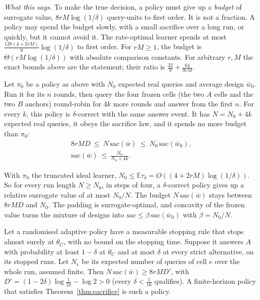 \emph{What this says.} To make the true decision, a policy must give up a \emph{budget} of
surrogate value, $8rM\log(1/\delta)$ query-units to first order. It is not a fraction. A policy
may spend the budget slowly, with a small sacrifice over a long run, or quickly, but it cannot
avoid it. The rate-optimal learner spends at most $\frac{128(4+2rM)}{9}\log(1/\delta)$ to first
order. For $rM\ge1$, the budget is $\Theta(rM\log(1/\delta))$ with absolute comparison constants.
For arbitrary $r,M$ the exact bounds above are the statement; their ratio is
$\frac{32}{9}+\frac{64}{9rM}$.

\begin{theorem}
\label{thm:dilute}
Let $\pi_{0}$ be a policy as above with $N_{0}$ expected real queries and average design
$\bar w_{0}$. Run it for its $n$ rounds, then query the four frozen cells (the two $A$ cells and the two $B$ anchors) round-robin for $4k$ more
rounds and answer from the first $n$. For every $k$, this policy is $\delta$-correct with the same
answer event. It has $N=N_{0}+4k$ expected real queries, it obeys the sacrifice law, and it spends
no more budget than $\pi_{0}$:
\begin{gather*}
8rMD\ \le\ N\,\mathrm{sac}(\bar w)\ \le\ N_{0}\,\mathrm{sac}(\bar w_{0}),\\
\mathrm{sac}(\bar w)\ \le\ \frac{N_{0}}{N_{0}+4k}.
\end{gather*}
\end{theorem}


With $\pi_{0}$ the truncated ideal learner, $N_{0}\le\mathbb{E}\tau_{\delta}
=O((4+2rM)\log(1/\delta))$. So for every run length $N\ge N_{0}$, in steps of four, a
$\delta$-correct policy gives up a relative surrogate value of at most $N_{0}/N$. The budget
$N\,\mathrm{sac}(\bar w)$ stays between $8rMD$ and $N_{0}$. The padding is surrogate-optimal, and
concavity of the frozen value turns the mixture of designs into
$\mathrm{sac}\le\beta\,\mathrm{sac}(\bar w_{0})$ with $\beta=N_{0}/N$.

\begin{theorem}
\label{thm:sacstop}
Let a randomised adaptive policy have a measurable stopping rule that stops almost surely at
$\theta_{C}$, with no bound on the stopping time. Suppose it answers $A$ with probability at least
$1-\delta$ at $\theta_{C}$ and at most $\delta$ at every strict alternative, on its stopped runs.
Let $N_{e}$ be its expected number of queries of cell $e$ over the whole run, assumed finite. Then
$N\,\mathrm{sac}(\bar w)\ge8rMD'$, with $D'=(1-2\delta)\log\frac1{2\delta}-\log2>0$ (every
$\delta<\frac1{16}$ qualifies). A finite-horizon policy that satisfies Theorem~\ref{thm:sacrifice}
is such a policy.
\end{theorem}

